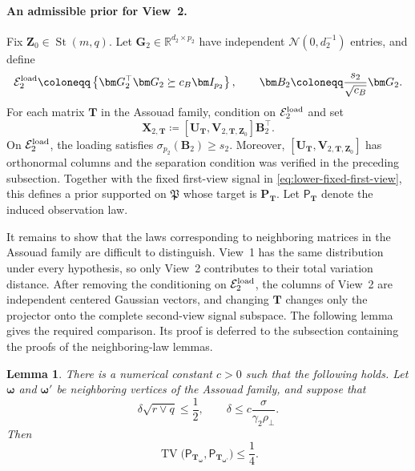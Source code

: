 \documentclass[11pt]{article}
\newtheorem{lemma}{Lemma}
\newcommand{\trans}{\top}
\begin{document}
\paragraph{An admissible prior for View~2.}
Fix $\bm Z_0\in\operatorname{St}(m,q)$.  Let
$\bm G_2\in\mathbb R^{d_2\times p_2}$ have independent
$\mathcal N(0,d_2^{-1})$ entries, and define
\[
  \mathcal E_2^{\rm load}
  \coloneqq
  \left\{
    \bm G_2^\trans\bm G_2
    \succeq
    c_B\bm I_{p_2}
  \right\},
  \qquad
  \bm B_2
  \coloneqq
  \frac{s_2}{\sqrt{c_B}}\bm G_2.
\]
For each matrix $\bm T$ in the Assouad family, condition on
$\mathcal E_2^{\rm load}$ and set
\begin{equation}
\label{eq:lower-regular-signal}
  \bm X_{2,\bm T}
  \coloneqq
  [\bm U_{\bm T},\bm V_{2,\bm T,\bm Z_0}]
  \bm B_2^\trans.
\end{equation}
On $\mathcal E_2^{\rm load}$, the loading satisfies
$\sigma_{p_2}(\bm B_2)\ge s_2$.  Moreover,
$[\bm U_{\bm T},\bm V_{2,\bm T,\bm Z_0}]$ has orthonormal columns and
the separation condition was verified in the preceding subsection.  Together
with the fixed first-view signal in
\cref{eq:lower-fixed-first-view}, this defines a prior supported on
$\mathfrak P$ whose target is $\bm P_{\bm T}$.  Let
$\mathsf P_{\bm T}$ denote the induced observation law.

It remains to show that the laws corresponding to neighboring matrices in
the Assouad family are difficult to distinguish.  View~1 has the same
distribution under every hypothesis, so only View~2 contributes to their
total variation distance.  After removing the conditioning on
$\mathcal E_2^{\rm load}$, the columns of View~2 are independent centered Gaussian
vectors, and changing $\bm T$ changes only the projector onto the complete
second-view signal subspace.  The following lemma gives the required
comparison.  Its proof is deferred to the subsection containing the proofs
of the neighboring-law lemmas.

\begin{lemma}
\label{lem:lower-regular-edge}
There is a numerical constant $c>0$ such that the following holds.  Let
$\bm\omega$ and $\bm\omega'$ be neighboring vertices of the Assouad family,
and suppose that
\[
  \delta\sqrt{r\vee q}\le\frac12,
  \qquad
  \delta
  \le
  c\frac{\sigma}{\gamma_2\rho_\perp}.
\]
Then
\[
  \operatorname{TV}\bigl(
    \mathsf P_{\bm T_{\bm\omega}},
    \mathsf P_{\bm T_{\bm\omega'}}
  \bigr)
  \le\frac14.
\]
\end{lemma}
\end{document}
